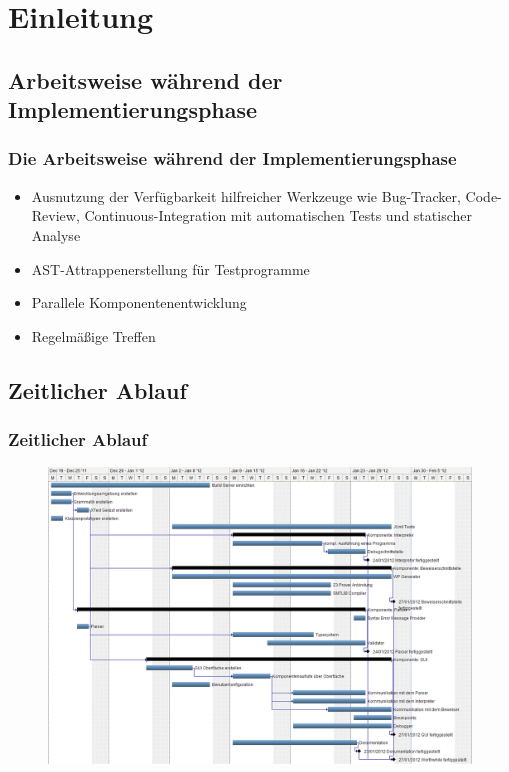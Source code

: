 \section{Einleitung}

\subsection{Arbeitsweise während der Implementierungsphase}
\begin{frame}
\frametitle{Die Arbeitsweise während der Implementierungsphase}

\begin{itemize}
	\item<+-> Ausnutzung der Verfügbarkeit hilfreicher Werkzeuge wie Bug-Tracker, Code-Review, Continuous-Integration mit automatischen Tests und statischer Analyse
	\item<+-> AST-Attrappenerstellung für Testprogramme
	\item<+-> Parallele Komponentenentwicklung
	\item<+-> Regelmäßige Treffen
\end{itemize}
\end{frame}

\subsection{Zeitlicher Ablauf}
\begin{frame}
\frametitle{Zeitlicher Ablauf}

\begin{figure}
	\vspace{-0.15cm}
	\includegraphics[height=0.95\textheight]{../bericht/images/gantt_implementierung_diag.png}
\end{figure}
\end{frame}
